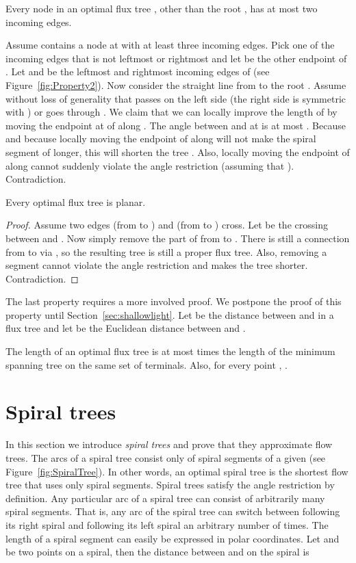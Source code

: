 \documentclass{journalA4}
\begin{document}
\begin{property}\label{property:optbinary}
Every node in an optimal flux tree , other than the root , has at most two incoming edges.
\end{property}
\medskip

Assume  contains a node at  with at least three incoming edges. Pick one of the incoming edges  that is not leftmost or rightmost and let  be the
other endpoint of . Let  and  be the leftmost and rightmost incoming edges of  (see Figure~\ref{fig:Property2}). Now consider the straight line  from  to the root . Assume without loss of generality that  passes  on the left side (the right side is symmetric with ) or  goes through . We claim that we can locally improve the length of  by moving the endpoint at  of  along . The angle between  and  at  is at most . Because  and because locally moving the endpoint of  along  will not make the spiral segment of  longer, this will shorten the tree . Also, locally moving the endpoint of  along  cannot suddenly violate the angle restriction (assuming that ). Contradiction.\hfill\QED

\begin{property}
\label{property:optplanar}
Every optimal flux tree is planar.
\end{property}
\begin{proof}
Assume two edges  (from  to ) and  (from  to ) cross. Let  be the crossing between  and . Now simply remove the part of  from  to . There is still a connection from  to  via , so the resulting tree is still a proper flux tree. Also, removing a segment cannot violate the angle restriction and makes the tree shorter. Contradiction.
\end{proof}
The last property requires a more involved proof. We postpone the proof of this property until Section~\ref{sec:shallowlight}. Let  be the distance between  and  in a flux tree  and let  be the Euclidean distance between  and .
\begin{property}
\label{property:shallowlight} The length of an optimal flux tree  is at most  times the length of the minimum spanning tree on the same
set of terminals. Also, for every point , .
\end{property}

\section{Spiral trees}\label{sec:spiraltrees}

In this section we introduce \emph{spiral trees} and prove that they approximate flow trees. The arcs of a spiral tree consist only of spiral segments of a given  (see
Figure~\ref{fig:SpiralTree}). In other words, an optimal spiral tree is the shortest flow tree that uses only spiral segments. Spiral trees satisfy the angle restriction by
definition. Any particular arc of a spiral tree can consist of arbitrarily many spiral segments. That is, any arc of the spiral tree can switch between following its right spiral
and following its left spiral an arbitrary number of times. The length of a spiral segment can easily be expressed in polar coordinates. Let 
and  be two points on a spiral, then the distance  between  and  on the spiral is
\end{document}
